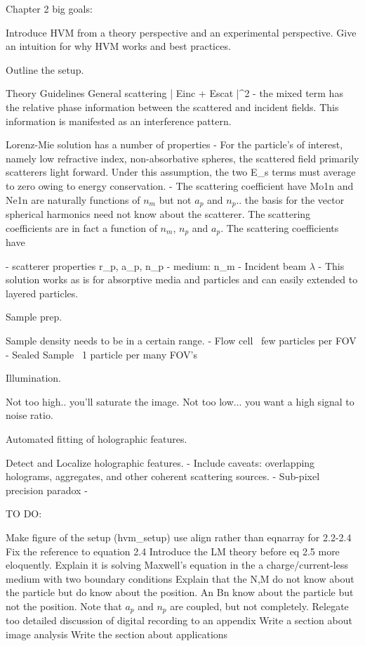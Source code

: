 Chapter 2 big goals:

Introduce HVM from a theory perspective and an experimental perspective.
Give an intuition for why HVM works and best practices.

Outline the setup.

Theory Guidelines
 General scattering | Einc + Escat |^2
 - the mixed term has the relative phase information between
   the scattered and incident fields. This information is manifested
   as an interference pattern.

 Lorenz-Mie solution has a number of properties
 - For the particle's of interest, namely low refractive index, non-absorbative
 spheres, the scattered field primarily scatterers light forward. Under this
 assumption, the two E_s terms must average to zero owing to energy conservation.
 - The scattering coefficient have
 Mo1n and Ne1n are naturally functions of $n_m$ but not $a_p$ and $n_p$.. the basis
 for the vector spherical harmonics need not know about the scatterer. The scattering
 coefficients are in fact a function of $n_m$, $n_p$ and $a_p$. The scattering coefficients
 have

 - scatterer properties r_p, a_p, n_p
 - medium: n_m
 - Incident beam  $\lambda$
 - This solution works as is for absorptive media and particles and can easily
 extended to layered particles.


Sample prep.

Sample density needs to be in a certain range.
- Flow cell ~few particles per FOV
- Sealed Sample ~1 particle per many FOV's

Illumination.

Not too high.. you'll saturate the image.
Not too low... you want a high signal to noise ratio.

Automated fitting of holographic features.

Detect and Localize holographic features.
- Include caveats: overlapping holograms, aggregates, and other coherent scattering sources.
- Sub-pixel precision paradox
- 


TO DO:

   Make figure of the setup (hvm_setup)
   use align rather than eqnarray for 2.2-2.4
   Fix the reference to equation 2.4
   Introduce the LM theory before eq 2.5 more eloquently. Explain it is solving
   Maxwell's equation in the a charge/current-less medium with two boundary
   conditions
   Explain that the N,M do not know about the particle but do know
   about the position. An Bn know about the
   particle but not the position. Note that $a_p$ and $n_p$ are coupled,
   but not completely.
   Relegate too detailed discussion of digital recording to an appendix
   Write a section about image analysis
   Write the section about applications
   
